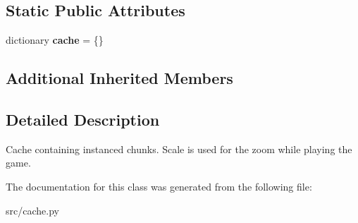 \subsection*{Static Public Attributes}
\begin{DoxyCompactItemize}
\item 
\hypertarget{classsrc_1_1cache_1_1_chunk_cache_a0488eace5e6eaa55065ce04472b7054d}{}\label{classsrc_1_1cache_1_1_chunk_cache_a0488eace5e6eaa55065ce04472b7054d} 
dictionary {\bfseries cache} = \{\}
\end{DoxyCompactItemize}
\subsection*{Additional Inherited Members}


\subsection{Detailed Description}
\begin{DoxyVerb}Cache containing instanced chunks. Scale is used for the zoom while
playing the game.
\end{DoxyVerb}
 

The documentation for this class was generated from the following file\+:\begin{DoxyCompactItemize}
\item 
src/cache.\+py\end{DoxyCompactItemize}
